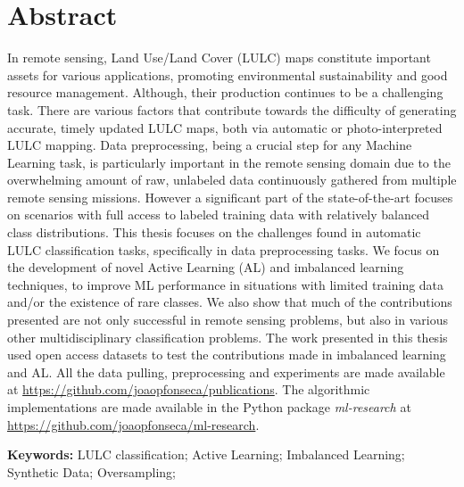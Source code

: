 \chapter*{Abstract}

\begin{adjustwidth}{30pt}{30pt}

    In remote sensing, Land Use/Land Cover (LULC) maps constitute important
    assets for various applications, promoting environmental sustainability
    and good resource management. Although, their production continues to be a
    challenging task.  There are various factors that contribute towards the
    difficulty of generating accurate, timely updated LULC maps, both via
    automatic or photo-interpreted LULC mapping. Data preprocessing, being a
    crucial step for any Machine Learning task, is particularly important in
    the remote sensing domain due to the overwhelming amount of raw, unlabeled
    data continuously gathered from multiple remote sensing missions. However
    a significant part of the state-of-the-art focuses on scenarios with full
    access to labeled training data with relatively balanced class
    distributions. This thesis focuses on the challenges found in automatic
    LULC classification tasks, specifically in data preprocessing tasks.  We
    focus on the development of novel Active Learning (AL) and imbalanced
    learning techniques, to improve ML performance in situations with limited
    training data and/or the existence of rare classes. We also show that much
    of the contributions presented are not only successful in remote sensing
    problems, but also in various other multidisciplinary classification
    problems. The work presented in this thesis used open access datasets to
    test the contributions made in imbalanced learning and AL. All the data
    pulling, preprocessing and experiments are made available at
    \href{https://github.com/joaopfonseca/publications}{https://github.com/joaopfonseca/publications}.
    The algorithmic implementations are made available in the Python package
    \textit{ml-research} at
    \href{https://github.com/joaopfonseca/ml-research}{https://github.com/joaopfonseca/ml-research}.

\end{adjustwidth}

\vspace{.5cm}
\textbf{Keywords:} LULC classification; Active Learning;
Imbalanced Learning; Synthetic Data; Oversampling; 
